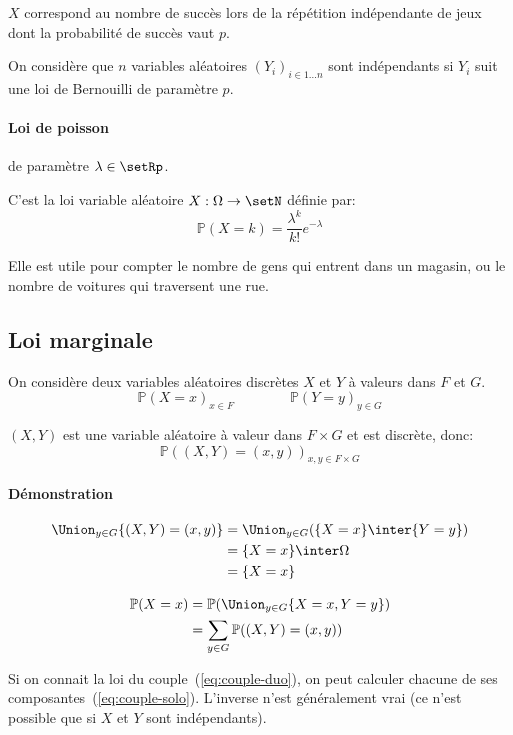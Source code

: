 \documentclass[a4paper,10pt,french,openany]{memoir}
\newcommand{\Proba}{\mathbb{P}}
\begin{document}
$X$ correspond au nombre de succès lors de la répétition indépendante de jeux dont la probabilité de succès vaut $p$.

On considère que $n$ variables aléatoires $(Y_i)_{i\in 1\dots n}$ sont indépendants si $Y_i$ suit une loi de Bernouilli de paramètre $p$.

\paragraph{Loi de poisson} de paramètre $\lambda \in \setRp$.

C'est la loi variable aléatoire $X: \Omega \rightarrow \setN$ définie par:
\[\Proba(X=k)=\frac{\lambda^k}{k!} e^{-\lambda}\]

Elle est utile pour compter le nombre de gens qui entrent dans un magasin, ou le nombre de voitures qui traversent une rue.

\subsection{Loi marginale}

On considère deux variables aléatoires discrètes $X$ et $Y$ à valeurs dans $F$ et $G$.
\begin{equation} \Proba(X=x)_{x\in F} \qquad\qquad \Proba(Y=y)_{y\in G} \label{eq:couple-solo}\end{equation}

$(X,Y)$ est une variable aléatoire à valeur dans $F \times G$ et est discrète, donc:
\begin{equation} \Proba((X,Y)=(x,y))_{x,y \in F \times G} \label{eq:couple-duo}\end{equation}

\paragraph{Démonstration}
\begin{align*}
 \Union_{y\in G} \{(X,Y)=(x,y)\} &= \Union_{y\in G} (\{X=x\}\inter\{Y=y\})\\
    &= \{X=x\}\inter \Omega\\
    &= \{X=x\}
\end{align*}

\begin{align*}
 \Proba(X=x) &= \Proba(\Union_{y\in G} \{X=x,Y=y\}) \\
    &= \sum_{y\in G} \Proba((X,Y)=(x,y))
\end{align*}

Si on connait la loi du couple~(\ref{eq:couple-duo}), on peut calculer chacune de ses composantes~(\ref{eq:couple-solo}). L'inverse n'est généralement vrai (ce n'est possible que si $X$ et $Y$ sont indépendants).
\end{document}
